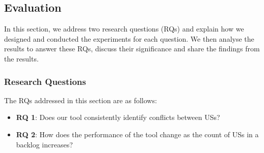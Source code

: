 \subsection{Evaluation}\label{conflict_evaluation}
In this section, we address two research questions (RQs) and explain how we designed and conducted the experiments for each question. We then analyse the results to answer these RQs, discuss their significance and share the findings from the results.
\subsubsection*{Research Questions}
The RQs addressed in this section are as follows:
\begin{itemize}
	\item \textbf{RQ 1}: Does our tool consistently identify conflicts between USs?
	\item \textbf{RQ 2}: How does the performance of the tool change as the count of USs in a backlog increases?
	\end{itemize}
